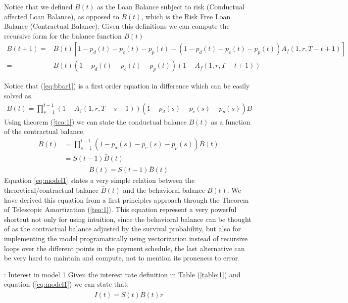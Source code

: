 Notice that we defined $B(t)$ as the Loan Balance subject to risk (Conductual affected Loan Balance), as opposed to $\bar{B}(t)$, which is the Risk Free Loan Balance (Contractual Balance).  Given this definitions we can compute the recursive form for the balance function $B(t)$
\begin{align}
B(t+1) =& B(t)[1-p_d(t)-p_c(t)-p_p(t)-(1-p_d(t)-p_c(t)-p_p(t))A_f(1,r,T-t+1) ] \nonumber\\
     =&
    B(t)(1-p_d(t)-p_c(t)-p_p(t))(1-A_f(1,r,T-t+1)) \label{eq:bbar1}\
\end{align}


Notice that (\ref{eq:bbar1}) is a first order equation in difference which can be easily solved as.
\begin{align}
    B(t) =\prod^{t-1}_{s=1} (1-A_f(1,r,T-s+1))(1-p_d(s)-p_c(s)-p_p(s))B
\end{align}
Using theorem (\ref{teo:1}) we can state the conductual balance $B(t)$ as a function of the contractual balance.
\begin{align}
    B(t) &=\prod^{t-1}_{s=1} (1-p_d(s)-p_c(s)-p_p(s))\bar{B}(t) \nonumber\\
    &=S(t-1)\bar{B}(t) \nonumber
\end{align}
\begin{align}
    \boxed{B(t)=S(t-1)\bar{B}(t) } \label{eq:model1}
\end{align}
Equation \ref{eq:model1} states a very simple relation between the theoretical/contractual balance $\bar{B}(t)$ and the behavioral balance $B(t)$. We have derived this equation from a first principles approach through the Theorem of Telescopic Amortization (\ref{teo:1}). This equation represent a very powerful shortcut not only for using intuition, since the behavioral balance can be thought of as the contractual balance adjusted by the survival probability, but also for implementing the model programatically using vectorization instead of recursive loops over the different points in the payment schedule, the last alternative can be very hard to maintain and compute, not to mention its proneness to error.
\begin{corollary}{: Interest in model 1}
Given the interest rate definition in Table (\ref{table:1}) and equation (\ref{eq:model1}) we can state that:
\begin{align}
    \boxed{I(t)=S(t)\bar{B}(t)r}
\end{align}


\end{corollary}

